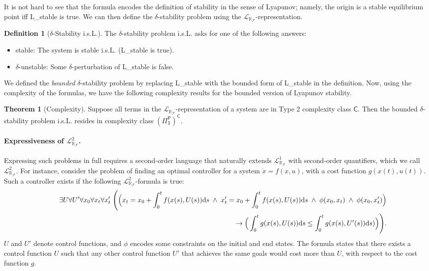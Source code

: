 \documentclass[10pt]{article}
\newcommand{\lrf}{\mathcal{L}_{\mathbb{R}_{\mathcal{F}}}}
\theoremstyle{definition}
\newtheorem{definition}{Definition}
\newtheorem{theorem}{Theorem}
\begin{document}
It is not hard to see that the formula encodes the definition of stability in the sense of Lyapunov; namely, the origin is a stable equilibrium point iff {\sf L\_stable} is true. We can then define the $\delta$-stability problem using the $\lrf$-representation.  
\begin{definition}[$\delta$-Stability i.s.L.]\label{sl}
The $\delta$-stability problem i.s.L. asks for one of the following answers:
\begin{itemize}
\item {\sf stable}: The system is stable i.s.L. ({\sf L\_stable} is true). 
\item {\sf $\delta$-unstable}: Some $\delta$-perturbation of {\sf L\_stable} is false. 
\end{itemize}
\end{definition}
We defined the {\em bounded} $\delta$-stability problem by replacing {\sf L\_stable} with the bounded form of {\sf L\_stable} in the definition. Now, using the complexity of the formulas, we have the following complexity results for the bounded version of Lyapunov stability. 
\begin{theorem}[Complexity]
Suppose all terms in the $\lrf$-representation of a system are in Type 2 complexity class $\mathsf{C}$.  Then the bounded $\delta$-stability problem i.s.L. resides in complexity class $\mathsf{(\Pi^P_3)^C}$. 
\end{theorem}

\paragraph{Expressiveness of $\lrf^2$.} Expressing such problems in full requires a second-order language that naturally extends $\lrf^1$ with second-order quantifiers, which we call $\lrf^2$. For instance, consider the problem of finding an optimal controller for a system $\dot x = f({x}, u)$, with a cost function $g(x(t),u(t))$. Such a controller exists if the following $\lrf^2$-formula is true:
\begin{eqnarray*}
& &\exists U \forall U' \forall {x_0}\forall {x_t} \forall {x_t'} \;\Bigg( \Big({x_t} = {x_0} + \int_{0}^t f({x}(s),U(s))\mathrm{d}s \;\wedge\;  x_t' = x_0 + \int_{0}^t f(x(s),U(s))\mathrm{d}s
\;\wedge\; \phi(x_0, x_t) \;\wedge\; \phi(x_0, x_t')\Big)\\
& &\hspace{9.5cm} \rightarrow \Big(\int_0^t g(x(s),U(s))\mathrm{d}s \leq  \int_0^t g(x(s),U'(s))\mathrm{d}s)\Big) \Bigg).
\end{eqnarray*}
$U$ and $U'$ denote control functions, and $\phi$ encodes some constraints on the initial and end states. The formula states that there exists a control function $U$ such that any other control function $U'$ that achieves the same goals would cost more than $U$, with respect to the cost function $g$. 
\end{document}
